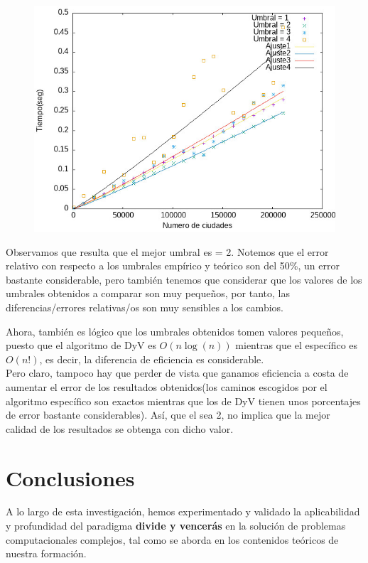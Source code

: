 \documentclass{article}
\begin{document}
    \begin{figure}[H]
        \centering
        \includegraphics[scale=0.75]{P3/Umbral/Imagen_UMBRAL_comparativa.jpeg}
    \end{figure}

    Observamos que resulta que el mejor umbral es  = 2. Notemos que el error relativo con respecto a los umbrales empírico y teórico son del 50\%, un error bastante considerable, pero también tenemos que considerar que los valores de los umbrales obtenidos a comparar son muy pequeños, por tanto, las diferencias/errores relativas/os son muy sensibles a los cambios. 
    
    Ahora, también es lógico que los umbrales obtenidos tomen valores 
    pequeños, puesto que el algoritmo de DyV es $O(n\log(n))$ mientras 
    que el específico es $O(n!)$, es decir, la diferencia de eficiencia es considerable. \\
    Pero claro, tampoco hay que perder de vista que ganamos eficiencia a costa de aumentar el error de los resultados obtenidos(los caminos escogidos por el algoritmo específico son exactos mientras que los de DyV tienen unos porcentajes de error bastante considerables). Así, que el  sea 2, no implica que la mejor calidad de los resultados se obtenga con dicho valor. 
    
\newpage

\section{Conclusiones}
A lo largo de esta investigación, hemos experimentado y validado la aplicabilidad y profundidad del paradigma \textbf{divide y vencerás} en la solución de problemas computacionales complejos, tal como se aborda en los contenidos teóricos de nuestra formación.
\end{document}
